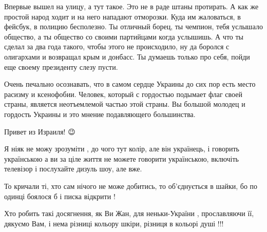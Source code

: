 \begin{itemize}
Впервые вышел на улицу, а тут такое. Это не в раде штаны протирать. А как же
простой народ ходит и на него нападают отморозки. Куда им жаловаться, в фейсбук, в
полицию бесполезно. Ты отличный борец, ты чемпион, тебя услышало общество, а ты
общество со своими партийцами когда услышишь. А что ты сделал за два года
такого, чтобы этого не происходило, ну да боролся с олигархами и возвращал крым и
донбасс. Ты думаешь только про себя, пойди еще своему президенту слезу пусти.

 

Очень печально осознавать, что в самом сердце Украины до сих пор есть место
расизму и ксенофобии. Человек, который с гордостью подымает флаг своей страны,
является неотъемлемой частью этой страны. Вы большой молодец и гордость Украины
и это мнение подавляющего большинства.

Привет из Израиля! 😉


 

Я ніяк не можу зрозуміти , до чого тут колір, але він українець, і говорить
українською а ви за ціле життя не можете говорити українською, включіть
телевізор і послухайте дизуль шоу, але вже.


 

То кричали ті, хто сам нічого не може добитись, то об’єднується в шайки, бо по
одинці боялося б і писка відкрити !

Хто робить такі досягнення, як Ви Жан, для неньки-України , прославляючи її,
дякуємо Вам, і нема різниці кольору шкіри, різниця в кольорі душі !!!

 


\end{itemize}
